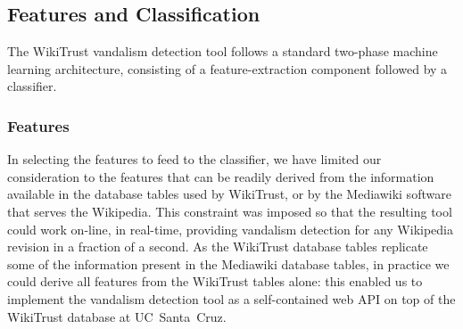 \newcommand{\sign}{{{\textrm{sign}}}}

\subsection{Features and Classification}

The WikiTrust vandalism detection tool follows a standard two-phase machine learning architecture, consisting of a feature-extraction component followed by a classifier.

\subsubsection{Features}

In selecting the features to feed to the classifier, we have limited our consideration to the features that can be readily derived from the information available in the database tables used by WikiTrust, or by the Mediawiki software that serves the Wikipedia.
This constraint was imposed so that the resulting tool could work on-line, in real-time, providing vandalism detection for any Wikipedia revision in a fraction of a second.
As the WikiTrust database tables replicate some of the information present in the Mediawiki database tables, in practice we could derive all features from the WikiTrust tables alone: this enabled us to implement the vandalism detection tool as a self-contained web API on top of the WikiTrust database at UC~Santa~Cruz.

